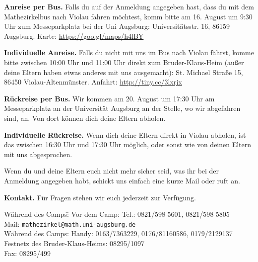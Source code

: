 \documentclass[12pt]{zettel}
\begin{document}
\begin{shaded}
\textbf{Anreise per Bus.} Falls du auf der Anmeldung angegeben hast, dass du mit dem
Mathezirkelbus nach Violau fahren möchtest, komm bitte am 16. August um
9:30 Uhr zum Messeparkplatz bei der Uni Augsburg: Universitätsstr. 16, 86159
Augsburg. Karte: \url{https://goo.gl/maps/h4lBY}

\textbf{Individuelle Anreise.} Falls du nicht mit uns im Bus nach Violau fährst, komme bitte
zwischen 10:00 Uhr und 11:00 Uhr direkt zum Bruder-Klaus-Heim (außer deine Eltern haben etwas anderes mit uns ausgemacht):
St. Michael Straße 15, 86450 Violau-Altenmünster. Anfahrt:
\url{http://tiny.cc/3lxrjx}
\end{shaded}

\begin{shaded}
\textbf{Rückreise per Bus.} Wir kommen am 20. August um 17:30 Uhr am Messeparkplatz an der Universität Augsburg an der Stelle, wo wir abgefahren sind, an. Von dort können dich deine Eltern abholen.

\textbf{Individuelle Rückreise.} Wenn dich deine Eltern direkt in Violau abholen, ist das zwischen 16:30 Uhr und 17:30 Uhr möglich, oder sonst wie von deinen Eltern mit uns abgesprochen.

Wenn du und deine Eltern euch nicht mehr sicher seid, was ihr bei der Anmeldung angegeben habt,
schickt uns einfach eine kurze Mail oder ruft an.
\end{shaded}


\begin{shaded}
\textbf{Kontakt.} Für Fragen stehen wir euch jederzeit zur Verfügung.
\begin{tabbing}
  Während des Camps:\quad \= \kill
  Vor dem Camp: \> Tel.: 0821/598-5601, 0821/598-5805 \\
  \> Mail: \texttt{mathezirkel@math.uni-augsburg.de} \\[0.5em]
  Während des Camps: \> Handy: 0163/7363229, 0176/81160586, 0179/2129137 \\
  \> Festnetz des Bruder-Klaus-Heims: 08295/1097 \\
  \> Fax: 08295/499
\end{tabbing}
\vspace{-1em}
\end{shaded}

\newpage
\end{document}
